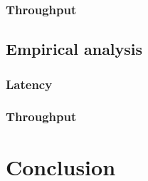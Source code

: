 \documentclass[a4paper]{article}
\begin{document}
\subsubsection*{Throughput}

\subsection{Empirical analysis}

\subsubsection*{Latency}

\subsubsection*{Throughput}

\section*{Conclusion}
\end{document}
